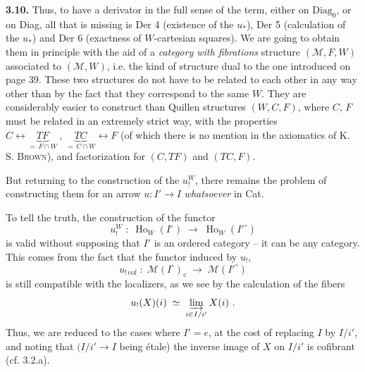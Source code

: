 \documentclass[11pt]{article}
\newcommand{\msp}[1]{\marginpar{\footnotesize [#1]}}
\newcommand{\Ho}{\operatorname{Ho}}
\newcommand{\M}{\mathcal{M}}
\begin{document}
\msp{page 65}
\textbf{3.10.} Thus, to have a derivator in the full sense of the term, either on $\mathrm{Diag}_0$, or on Diag, all that is missing is Der 4 (existence of the $u_*$), Der 5 (calculation of the $u_*$) and Der 6 (exactness of $W$-cartesian squares). We are going to obtain them in principle with the aid of a \textit{category with fibrations} structure $(\M,F,W)$ associated to $(\M,W)$, i.e. the kind of structure dual to the one introduced %
on page 39. These two structures do not have to be related to each other in any way other than by the fact that they correspond to the same $W$. They are considerably easier to construct than Quillen structures $(W,C,F)$, where $C$, $F$ must be related in an extremely strict way, with the properties $C \longleftrightarrow \underbrace{TF}_{=\,F\cap W}\ ,\ \underbrace{TC}_{=\,C\cap W} \longleftrightarrow F$ (of which there is no mention in the axiomatics of K. S. \textsc{Brown}), and factorization for $(C,TF)$ and $(TC,F)$.

\msp{page 66}
But returning to the construction of the $u_!^W$, there remains the problem of constructing them for an arrow $u : I'\longrightarrow I$ \textit{whatsoever} in Cat. %

To tell the truth, the construction of the functor
\[
u_!^W \;:\; \Ho_W(I^\circ) \;\longrightarrow\; \Ho_W(I'^\circ) \tag*{(3.3.1)}
\]
is valid without supposing that $I'$ is an ordered category – it can be any category. This comes from the fact that the functor induced by $u_!$,
\[
u_{!\,\mathrm{cof}} \;:\; \M(I^\circ)_{\mathrm{c}} \;\longrightarrow\; \M(I'^\circ)
\]
is still compatible with the localizers, as we see by the calculation of the fibers
\[
u_!(X)(i) \;\simeq\; \varinjlim_{i\in I/i'} X(i)\ . %
\]
Thus, we are reduced to the cases where $I' = e$, at the cost of replacing $I$ by $I/i'$, and noting that %
$(I/i'\longrightarrow I$ being étale) the inverse image of $X$ on $I/i'$ is cofibrant (cf. 3.2.a). %
\end{document}
